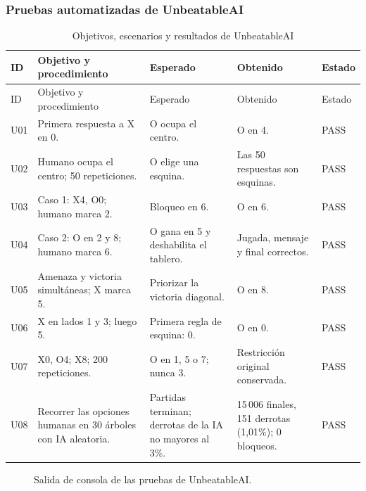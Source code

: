 \documentclass[12pt,a4paper]{article}
\begin{document}
\subsubsection{Pruebas automatizadas de UnbeatableAI}
\begin{longtable}{p{1cm}p{3.4cm}p{3.3cm}p{3.4cm}p{1.6cm}}
\caption{Objetivos, escenarios y resultados de UnbeatableAI}\\
\toprule ID & Objetivo y procedimiento & Esperado & Obtenido & Estado\\\midrule\endfirsthead
\toprule ID & Objetivo y procedimiento & Esperado & Obtenido & Estado\\\midrule\endhead
U01 & Primera respuesta a X en 0. & O ocupa el centro. & O en 4. & PASS\\
U02 & Humano ocupa el centro; 50 repeticiones. & O elige una esquina. & Las 50 respuestas son esquinas. & PASS\\
U03 & Caso 1: X4, O0; humano marca 2. & Bloqueo en 6. & O en 6. & PASS\\
U04 & Caso 2: O en 2 y 8; humano marca 6. & O gana en 5 y deshabilita el tablero. & Jugada, mensaje y final correctos. & PASS\\
U05 & Amenaza y victoria simultáneas; X marca 5. & Priorizar la victoria diagonal. & O en 8. & PASS\\
U06 & X en lados 1 y 3; luego 5. & Primera regla de esquina: 0. & O en 0. & PASS\\
U07 & X0, O4; X8; 200 repeticiones. & O en 1, 5 o 7; nunca 3. & Restricción original conservada. & PASS\\
U08 & Recorrer las opciones humanas en 30 árboles con IA aleatoria. & Partidas terminan; derrotas de la IA no mayores al 3\%. & 15\,006 finales, 151 derrotas (1,01\%); 0 bloqueos. & PASS\\
\bottomrule
\end{longtable}

\begin{figure}[H]

\caption{Salida de consola de las pruebas de UnbeatableAI.}
\label{fig:consola-unbeatable}
\end{figure}
\end{document}
